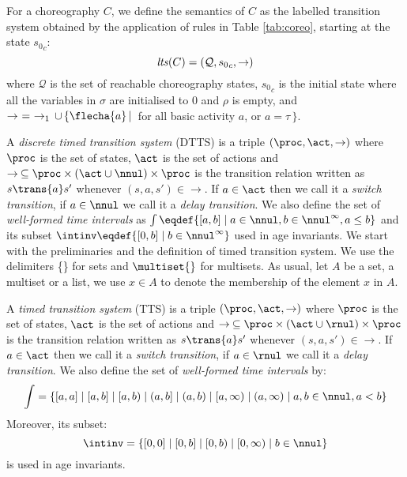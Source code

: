 \begin{definition}

For a choreography $C$, we define the
semantics of $C$ as the labelled transition system
obtained by the application of rules in Table \ref{tab:coreo}, starting at the state ${s_0}_c$:
\[
  {\it lts}(C) = (\mathcal{Q}, {s_0}_c,  \rightarrow)
\]
%
\noindent
where $\mathcal{Q}$ is the set of reachable choreography states, ${s_0}_c$ is the initial state where all the variables in $\sigma$ are initialised to 0 and $\rho$ is empty, and
$\rightarrow \,\,= \,\,\rightarrow_1 \,\cup\, \{ \flecha{a}\,|\,$
for all basic activity $a$, or $a=\tau \,\}$.
\vspace{0.1cm}
\end{definition}

A \emph{discrete timed transition system} (DTTS) 
is a triple $\left(\proc, \act,\rightarrow\right)$
where $\proc$ is the set of states, $\act$ is the set of actions
and $\rightarrow\: \subseteq \proc \times (\act \cup \nnul)  \times \proc$ is the 
transition relation written as $s \trans{a} s'$ whenever $(s,a,s') \in \rightarrow$.
If $a \in \act$ then we call it a \emph{switch transition}, if
$a \in \nnul$ we call it a \emph{delay transition}.
We also define the set of \emph{well-formed time intervals} as 
$\int \eqdef \{[a,b] \mid a \in \nnul,b\in \nnul^{\infty}, a\leq b \}$
and its subset $\intinv \eqdef \{[0,b] \mid b\in \nnul^{\infty} \}$
used in age invariants. 
We start with the preliminaries and the definition of timed transition system. 
We use the delimiters \{\} for sets and $\multiset{}$ for multisets.
As usual, let $A$ be a set, a multiset or a list, 
we use $x \in A$ to denote the membership of the element  $x$ in $A$. 

A \emph{timed transition system} (TTS) 
is a triple $\left(\proc, \act,\rightarrow\right)$
where $\proc$ is the set of states, $\act$ is the set of actions
and $\rightarrow\: \subseteq \proc \times (\act \cup \rnul)  \times \proc$ is the 
transition relation written as $s \trans{a} s'$ whenever $(s,a,s') \in \rightarrow$.
If $a \in \act$ then we call it a \emph{switch transition}, if
$a \in \rnul$ we call it a \emph{delay transition}.
We also define the set of \emph{well-formed time intervals} 
by: $$\int =\{ [a,a] \;|\; [a,b] \;|\; [a,b) \;|\; (a,b] \;|\; (a,b) \;|\; [a,\infty) \;|\; (a,\infty) \mid a,b \in \nnul,a < b\}$$
 Moreover, its subset: $$\intinv = \{ [0,0] \;|\; [0,b] \;|\; [0,b) \;|\; [0,\infty) \mid b \in \nnul\}$$
is used in age invariants. 

